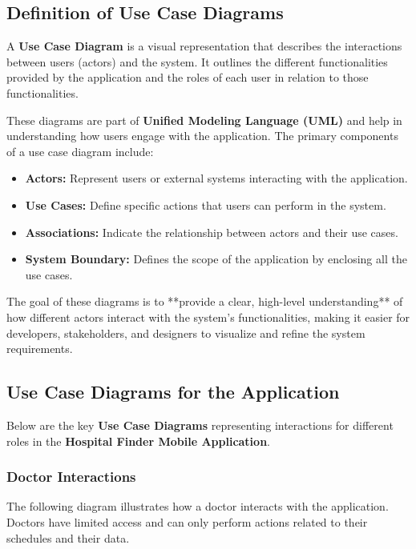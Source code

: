 \documentclass[12pt]{report}
\begin{document}
\subsection{\textbf{Definition of Use Case Diagrams}}


\noindent A \textbf{Use Case Diagram} is a visual representation that describes the interactions between users (actors) and the system. It outlines the different functionalities provided by the application and the roles of each user in relation to those functionalities.

\noindent These diagrams are part of \textbf{Unified Modeling Language (UML)} and help in understanding how users engage with the application. The primary components of a use case diagram include:

\begin{itemize}
	\item \textbf{Actors:} Represent users or external systems interacting with the application.
	\item \textbf{Use Cases:} Define specific actions that users can perform in the system.
	\item \textbf{Associations:} Indicate the relationship between actors and their use cases.
	\item \textbf{System Boundary:} Defines the scope of the application by enclosing all the use cases.
\end{itemize}

\noindent The goal of these diagrams is to **provide a clear, high-level understanding** of how different actors interact with the system’s functionalities, making it easier for developers, stakeholders, and designers to visualize and refine the system requirements.

\subsection{\textbf{Use Case Diagrams for the Application}}

\noindent Below are the key \textbf{Use Case Diagrams} representing interactions for different roles in the \textbf{Hospital Finder Mobile Application}.

\newpage
\subsubsection{\textbf{Doctor Interactions}}
The following diagram illustrates how a doctor interacts with the application. Doctors have limited access and can only perform actions related to their schedules and their data.
\end{document}
